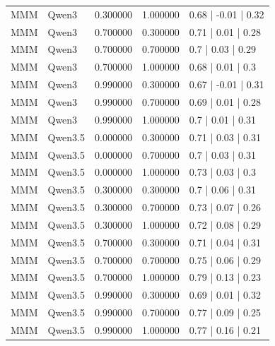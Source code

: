 \begin{longtable}{lllll}
MMM & Qwen3 & 0.300000 & 1.000000 & 0.68 | -0.01 | 0.32 \\
MMM & Qwen3 & 0.700000 & 0.300000 & 0.71 | 0.01 | 0.28 \\
MMM & Qwen3 & 0.700000 & 0.700000 & 0.7 | 0.03 | 0.29 \\
MMM & Qwen3 & 0.700000 & 1.000000 & 0.68 | 0.01 | 0.3 \\
MMM & Qwen3 & 0.990000 & 0.300000 & 0.67 | -0.01 | 0.31 \\
MMM & Qwen3 & 0.990000 & 0.700000 & 0.69 | 0.01 | 0.28 \\
MMM & Qwen3 & 0.990000 & 1.000000 & 0.7 | 0.01 | 0.31 \\
MMM & Qwen3.5 & 0.000000 & 0.300000 & 0.71 | 0.03 | 0.31 \\
MMM & Qwen3.5 & 0.000000 & 0.700000 & 0.7 | 0.03 | 0.31 \\
MMM & Qwen3.5 & 0.000000 & 1.000000 & 0.73 | 0.03 | 0.3 \\
MMM & Qwen3.5 & 0.300000 & 0.300000 & 0.7 | 0.06 | 0.31 \\
MMM & Qwen3.5 & 0.300000 & 0.700000 & 0.73 | 0.07 | 0.26 \\
MMM & Qwen3.5 & 0.300000 & 1.000000 & 0.72 | 0.08 | 0.29 \\
MMM & Qwen3.5 & 0.700000 & 0.300000 & 0.71 | 0.04 | 0.31 \\
MMM & Qwen3.5 & 0.700000 & 0.700000 & 0.75 | 0.06 | 0.29 \\
MMM & Qwen3.5 & 0.700000 & 1.000000 & 0.79 | 0.13 | 0.23 \\
MMM & Qwen3.5 & 0.990000 & 0.300000 & 0.69 | 0.01 | 0.32 \\
MMM & Qwen3.5 & 0.990000 & 0.700000 & 0.77 | 0.09 | 0.25 \\
MMM & Qwen3.5 & 0.990000 & 1.000000 & 0.77 | 0.16 | 0.21 \\
\end{longtable}

